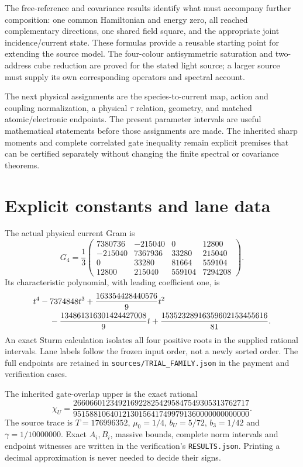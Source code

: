 \documentclass[11pt]{article}
\theoremstyle{definition}
\begin{document}
The free-reference and covariance results identify what must accompany further composition: one common Hamiltonian and energy zero, all reached complementary directions, one shared field square, and the appropriate joint incidence/current state. These formulas provide a reusable starting point for extending the source model. The four-colour antisymmetric saturation and two-address cube reduction are proved for the stated light source; a larger source must supply its own corresponding operators and spectral account.

The next physical assignments are the species-to-current map, action and coupling normalization, a physical $\tau$ relation, geometry, and matched atomic/electronic endpoints. The present parameter intervals are useful mathematical statements before those assignments are made. The inherited sharp moments and complete correlated gate inequality remain explicit premises that can be certified separately without changing the finite spectral or covariance theorems.

\appendix
\section{Explicit constants and lane data}\label{app:constants}

The actual physical current Gram is
\begin{equation}\label{eq:G4}
 G_4=\frac13\begin{pmatrix}
 7380736&-215040&0&12800\\
 -215040&7367936&33280&215040\\
 0&33280&81664&559104\\
 12800&215040&559104&7294208
 \end{pmatrix}.
\end{equation}
Its characteristic polynomial, with leading coefficient one, is
\begin{align}\label{eq:charpoly}
  &t^4-7374848t^3+\frac{163354428440576}{9}t^2\notag\\
 &\qquad-\frac{134861316301424427008}{9}t
 +\frac{15352328916359602153455616}{81}.
\end{align}
An exact Sturm calculation isolates all four positive roots in the supplied rational intervals. Lane labels follow the frozen input order, not a newly sorted order. The full endpoints are retained in \texttt{sources/TRIAL\_FAMILY.json} in the payment and verification cases.

The inherited gate-overlap upper is the exact rational
\begin{equation}\label{eq:chi}
 \chi_U=\frac{2660660123492169228254295847549305313762717}
 {9515881064012130156417499791360000000000000}.
\end{equation}
The source trace is $T=176996352$, $\mu_0=1/4$, $b_U=5/72$, $b_3=1/42$ and $\gamma=1/10000000$. Exact $A_i,B_i$, massive bounds, complete norm intervals and endpoint witnesses are written in the verification's \texttt{RESULTS.json}. Printing a decimal approximation is never needed to decide their signs.
\end{document}
